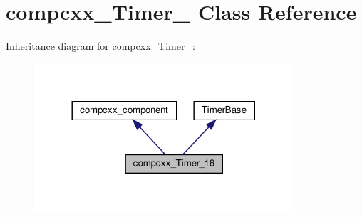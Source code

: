 \hypertarget{classcompcxx__Timer__16}{}\section{compcxx\+\_\+\+Timer\+\_ Class Reference}
\label{classcompcxx__Timer__16}


Inheritance diagram for compcxx\+\_\+\+Timer\+\_\+:\nopagebreak
\begin{figure}[H]
\begin{center}
\leavevmode
\includegraphics[width=272pt]{classcompcxx__Timer__16__inherit__graph}
\end{center}
\end{figure}


